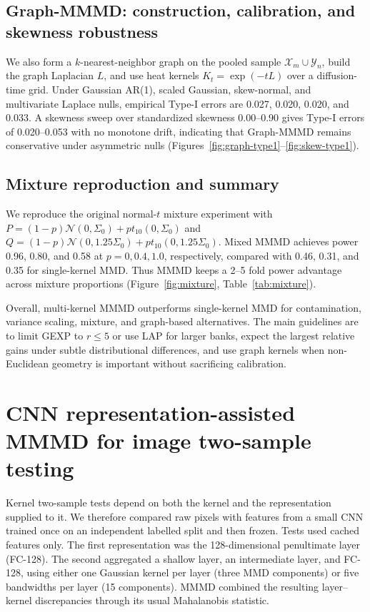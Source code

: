 \documentclass[12pt]{article}
\begin{document}
\subsection{Graph-MMMD: construction, calibration, and skewness robustness}

We also form a $k$-nearest-neighbor graph on the pooled sample $\mathcal{X}_m\cup\mathcal{Y}_n$, build the graph Laplacian $L$, and use heat kernels $K_t=\exp(-tL)$ over a diffusion-time grid. Under Gaussian AR(1), scaled Gaussian, skew-normal, and multivariate Laplace nulls, empirical Type-I errors are 0.027, 0.020, 0.020, and 0.033. A skewness sweep over standardized skewness 0.00--0.90 gives Type-I errors of 0.020--0.053 with no monotone drift, indicating that Graph-MMMD remains conservative under asymmetric nulls (Figures~\ref{fig:graph-type1}--\ref{fig:skew-type1}).

\subsection{Mixture reproduction and summary}

We reproduce the original normal-$t$ mixture experiment with $P=(1-p)\mathcal{N}(0,\Sigma_0)+pt_{10}(0,\Sigma_0)$ and $Q=(1-p)\mathcal{N}(0,1.25\Sigma_0)+pt_{10}(0,1.25\Sigma_0)$. Mixed MMMD achieves power 0.96, 0.80, and 0.58 at $p=0,0.4,1.0$, respectively, compared with 0.46, 0.31, and 0.35 for single-kernel MMD. Thus MMMD keeps a 2--5 fold power advantage across mixture proportions (Figure~\ref{fig:mixture}, Table~\ref{tab:mixture}).

Overall, multi-kernel MMMD outperforms single-kernel MMD for contamination, variance scaling, mixture, and graph-based alternatives. The main guidelines are to limit GEXP to $r\leq5$ or use LAP for larger banks, expect the largest relative gains under subtle distributional differences, and use graph kernels when non-Euclidean geometry is important without sacrificing calibration.

\section{CNN representation-assisted MMMD for image two-sample testing}
\label{sec:cnn-mmmd}

\begingroup
\setlength{\textfloatsep}{7pt plus 2pt minus 2pt}
\setlength{\intextsep}{6pt plus 2pt minus 2pt}
\setlength{\abovedisplayskip}{5pt}
\setlength{\belowdisplayskip}{5pt}
\captionsetup{font=small,skip=3pt}

Kernel two-sample tests depend on both the kernel and the representation supplied to it. We therefore compared raw pixels with features from a small CNN trained once on an independent labelled split and then frozen. Tests used cached features only. The first representation was the 128-dimensional penultimate layer (FC-128). The second aggregated a shallow layer, an intermediate layer, and FC-128, using either one Gaussian kernel per layer (three MMD components) or five bandwidths per layer (15 components). MMMD combined the resulting layer--kernel discrepancies through its usual Mahalanobis statistic.
\end{document}
